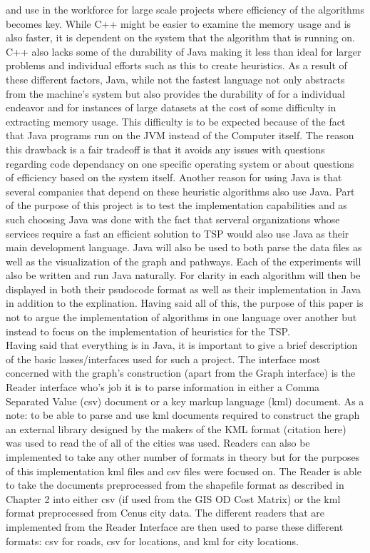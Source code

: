 \documentclass[midd]{thesis}
\newcommand{\tab}{\hspace*{2em}}
\begin{document}
and use in the workforce for large scale projects where efficiency of the algorithms becomes key.  While C++ might be easier to examine the memory usage and is also faster, it is dependent on the system that the algorithm that is running on. C++ also lacks some of the durability of Java making it less than ideal for larger problems and individual efforts such as this to create heuristics. As a result of these different factors, Java, while not the fastest language not only abstracts from the machine's system but also provides the durability of for a individual endeavor and for instances of large datasets at the cost of some difficulty in extracting memory usage. This difficulty is to be expected because of the fact that Java programs run on the JVM instead of the Computer itself. The reason this drawback is a fair tradeoff is that it avoids any issues with questions regarding code dependancy on one specific operating system or about questions of efficiency based on the system itself. Another reason for using Java is that several companies that depend on these heuristic algorithms also use Java. Part of the purpose of this project is to test the implementation capabilities and as such choosing Java was done with the fact that serveral organizations whose services require a fast an efficient solution to TSP would also use Java as their main development language. Java will also be  used to both parse the data files as well as the visualization of the graph and pathways. Each of the experiments will also be written and run Java naturally. For clarity in each algorithm will then  be displayed in both their psudocode format as well as their implementation in Java in addition to the  explination. Having said all of this, the purpose of this paper is not to argue the implementation of algorithms in one language over another but instead to focus on the implementation of heuristics for the TSP.\\
\tab Having said that everything is in Java, it is important to give a brief description of the basic lasses/interfaces used for such a project. The interface most concerned with the graph's construction (apart from the Graph interface) is the Reader interface who's job it is to parse information in either a Comma Separated Value (csv) document or a key markup language (kml) document. As a note: to be able to parse and use kml documents required to construct the graph an external library designed by the makers of the KML format (citation here) was used to read the of all of the cities was used. Readers can also be implemented to take any other number of formats in theory but for the purposes of this implementation kml files and csv files were focused on. The Reader is able to take the documents preprocessed from the shapefile format as described in Chapter 2 into either csv (if used from the GIS OD Cost Matrix) or the kml format preprocessed from Cenus city data. The different readers that are implemented from the Reader Interface are then used to parse these different formats: csv for roads, csv for locations, and kml for city locations.\\
\end{document}
